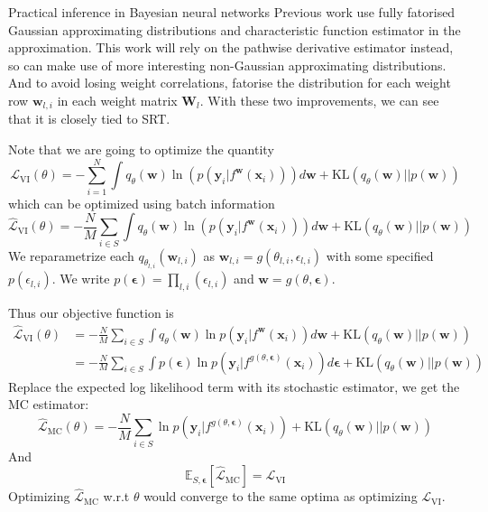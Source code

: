 \documentclass{beamer}
\begin{document}
\begin{frame}[allowframebreaks]{Practical inference in Bayesian neural networks}
Previous work use fully fatorised Gaussian approximating distributions and characteristic function estimator in the approximation. This work will rely on the pathwise derivative estimator instead, so can make use of more interesting non-Gaussian approximating distributions. And to avoid losing weight correlations, fatorise the distribution for each weight row $\mathbf{w}_{l,i}$ in each weight matrix $\mathbf{W}_l$. With these two improvements, we can see that it is closely tied to SRT.

\framebreak

Note that we are going to optimize the quantity
$$\mathcal{L}_{\text{VI}} (\theta) = - \sum_{i=1}^N \int q_\theta(\mathbf{w}) \ln (p(\mathbf{y}_i | f^\mathbf{w} (\mathbf{x}_i))) d\mathbf{w} + \text{KL}(q_\theta(\mathbf{w}) || p(\mathbf{w}))$$
which can be optimized using batch information
$$\hat{\mathcal{L}}_{\text{VI}} (\theta) = - \frac{N}{M}\sum_{i\in S} \int q_\theta(\mathbf{w}) \ln (p(\mathbf{y}_i | f^\mathbf{w} (\mathbf{x}_i))) d\mathbf{w} + \text{KL}(q_\theta(\mathbf{w}) || p(\mathbf{w}))$$
We reparametrize each $q_{\theta_{l,i}}(\mathbf{w}_{l,i})$ as $\bm{w}_{l,i} = g(\theta_{l,i}, \epsilon_{l,i})$ with some specified $p(\epsilon_{l,i})$. We write $p(\bm{\epsilon}) = \prod_{l,i}(\epsilon_{l,i})$ and $\mathbf{w} = g(\theta, \bm{\epsilon})$. 

\framebreak

Thus our objective function is 
\begin{align*}
\hat{\mathcal{L}}_{\text{VI}} (\theta) & = - \frac{N}{M}\sum_{i\in S} \int q_\theta(\mathbf{w}) \ln p(\mathbf{y}_i | f^\mathbf{w} (\mathbf{x}_i)) d\mathbf{w} + \text{KL}(q_\theta(\mathbf{w}) || p(\mathbf{w})) \\
& = - \frac{N}{M}\sum_{i\in S} \int p(\bm{\epsilon}) \ln p(\mathbf{y}_i | f^{g(\theta, \bm{\epsilon})} (\mathbf{x}_i)) d\bm{\epsilon} + \text{KL}(q_\theta(\mathbf{w}) || p(\mathbf{w}))
\end{align*}
Replace the expected log likelihood term with its stochastic estimator, we get the MC estimator:
$$\hat{\mathcal{L}}_{\text{MC}} (\theta)  = - \frac{N}{M}\sum_{i\in S}  \ln p(\mathbf{y}_i | f^{g(\theta, \bm{\epsilon})} (\mathbf{x}_i)) + \text{KL}(q_\theta(\mathbf{w}) || p(\mathbf{w}))$$
And 
$$\mathbb{E}_{S, \bm{\epsilon}} [\hat{\mathcal{L}}_{\text{MC}}] = \mathcal{L}_{\text{VI}}$$
Optimizing $\hat{\mathcal{L}}_{\text{MC}}$ w.r.t $\theta$ would converge to the same optima as optimizing $\mathcal{L}_{\text{VI}}$.


\end{frame}
\end{document}
